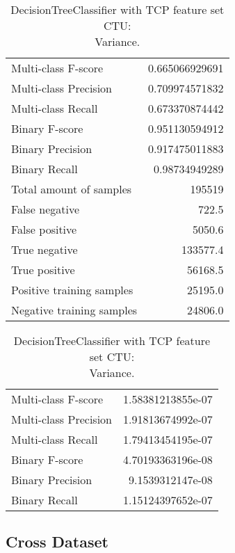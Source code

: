 \begin{table}[H]
\begin{minipage}{0.5\textwidth}
\caption{DecisionTreeClassifier with TCP feature set CTU: \\Average.}
\centering
\begin{tabular}{l r}
\toprule
Multi-class F-score & 0.665066929691 \\
Multi-class Precision & 0.709974571832 \\
Multi-class Recall & 0.673370874442 \\
\midrule
Binary F-score & 0.951130594912 \\
Binary Precision & 0.917475011883 \\
Binary Recall & 0.98734949289 \\
\midrule
Total amount of samples & 195519 \\
False negative & 722.5 \\
False positive & 5050.6 \\
True negative & 133577.4 \\
True positive & 56168.5 \\
\midrule
Positive training samples & 25195.0 \\
Negative training samples & 24806.0 \\
\bottomrule
\end{tabular}
\end{minipage}
\hfillx
\begin{minipage}{0.5\textwidth}
\caption{DecisionTreeClassifier with TCP feature set CTU: \\Variance.}
\centering
\begin{tabular}{l r}
\toprule
Multi-class F-score & 1.58381213855e-07 \\
Multi-class Precision & 1.91813674992e-07 \\
Multi-class Recall & 1.79413454195e-07 \\
\midrule
Binary F-score & 4.70193363196e-08 \\
Binary Precision & 9.1539312147e-08 \\
Binary Recall & 1.15124397652e-07 \\
\bottomrule
\end{tabular}
\end{minipage}
\end{table}


\newpage
\subsection{Cross Dataset}

